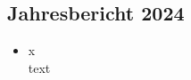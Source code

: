 \subsection{Jahresbericht 2024}
\begin{history}


    \begin{itemize}

        \item[]x\\
        text

    \end{itemize}

\end{history}
